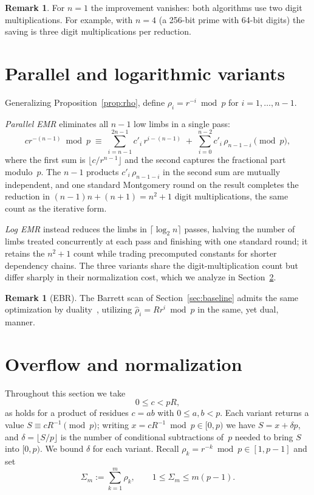 \documentclass[reqno]{amsart}
\theoremstyle{definition}
\newtheorem{remark}[theorem]{Remark}
\begin{document}
\begin{remark}
For $n=1$ the improvement vanishes: both algorithms use two digit multiplications.
For example, with $n=4$ (a 256-bit prime with 64-bit digits) the saving is three digit multiplications per reduction.
\end{remark}

\section{Parallel and logarithmic variants}\label{sec:parallel}

Generalizing Proposition~\ref{prop:rho}, define $\rho_i= r^{-i}\bmod p$ for $i=1,\ldots,n-1$.

\emph{Parallel EMR} eliminates all $n-1$ low limbs in a single pass:
\begin{equation}\label{eq:parallel}
  cr^{-(n-1)}\bmod p \;\equiv\; \sum_{i=n-1}^{2n-1} c'_i\, r^{i-(n-1)} \;+\; \sum_{i=0}^{n-2} c'_i\, \rho_{n-1-i} \pmod p,
\end{equation}
where the first sum is $\lfloor c/r^{n-1}\rfloor$ and the second captures the fractional part modulo~$p$.
The $n-1$ products $c'_i\,\rho_{n-1-i}$ in the second sum are mutually independent, and one standard Montgomery round on the result completes the reduction in $(n-1)n+(n+1) = n^2+1$ digit multiplications, the same count as the iterative form.

\emph{Log EMR} instead reduces the limbs in $\lceil\log_2 n\rceil$ passes, halving the number of limbs treated concurrently at each pass and finishing with one standard round; it retains the $n^2+1$ count while trading precomputed constants for shorter dependency chains.
The three variants share the digit-multiplication count but differ sharply in their normalization cost, which we analyze in Section~\ref{sec:overflow}.

\begin{remark}[EBR]\label{rem:ebr}
The Barrett scan of Section~\ref{sec:baseline} admits the same optimization by duality~\cite{domb2025blog}, utilizing $\hat\rho_i=Rr^i\bmod p$ in the same, yet dual, manner.
\end{remark}

\section{Overflow and normalization}\label{sec:overflow}

Throughout this section we take
\[
  0 \le c < pR,
\]
as holds for a product of residues $c=ab$ with $0\le a,b<p$.
Each variant returns a value $S\equiv cR^{-1}\pmod p$; writing $x=cR^{-1}\bmod p\in[0,p)$ we have $S=x+\delta p$, and $\delta=\lfloor S/p\rfloor$ is the number of conditional subtractions of~$p$ needed to bring $S$ into $[0,p)$.
We bound $\delta$ for each variant.
Recall $\rho_k= r^{-k}\bmod p\in[1,p-1]$ and set
\[
  \Sigma_m := \sum_{k=1}^{m}\rho_k, \qquad 1\le \Sigma_m\le m(p-1).
\]
\end{document}
